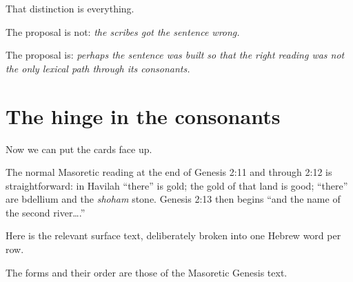 That distinction is everything.

The proposal is not: \textit{the scribes got the sentence wrong.}

The proposal is: \textit{perhaps the sentence was built so that the right reading was not the only lexical path through its consonants.}

\section*{The hinge in the consonants}

Now we can put the cards face up.

The normal Masoretic reading at the end of Genesis 2:11 and through 2:12 is straightforward: in Havilah ``there'' is gold; the gold of that land is good; ``there'' are bdellium and the \textit{shoham} stone. Genesis 2:13 then begins ``and the name of the second river\ldots{}.''\cite{MasoreticGenesis}

Here is the relevant surface text, deliberately broken into one Hebrew word per row.


The forms and their order are those of the Masoretic Genesis text.\cite{MasoreticGenesis}

